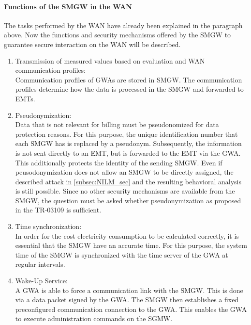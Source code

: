 \\
\textbf{Functions of the SMGW in the WAN}
\\
\\
The tasks performed by the \gls{WAN} have already been explained in the paragraph above. Now the functions and security mechanisms offered by the \gls{SMGW} to guarantee secure interaction on the \gls{WAN} will be described.
\begin{enumerate}
\item Transmission of measured values based on evaluation and \gls{WAN} communication profiles:\\
Communication profiles of \gls{GWA}s are stored in \gls{SMGW}. The communication profiles determine how the data is processed in the \gls{SMGW} and forwarded to \gls{EMT}s.

\item Pseudonymization:\\
Data that is not relevant for billing must be pseudonomized for data protection reasons. For this purpose, the unique identification number that each \gls{SMGW} has is replaced by a pseudonym. Subsequently, the information is not sent directly to an \gls{EMT}, but is forwarded to the \gls{EMT} via the \gls{GWA}. This additionally protects the identity of the sending \gls{SMGW}.%
Even if peusodonymization does not allow an \gls{SMGW} to be directly assigned, the described attack in \ref{subsec:NILM_sec} and the resulting behavioral analysis is still possible. Since no other security mechanisms are available from the \gls{SMGW}, the question must be asked whether pseudonymization as proposed in the \gls{TR-03109} is sufficient.

\item Time synchronization:\\
In order for the cost electricity consumption to be calculated correctly, it is essential that the \gls{SMGW} have an accurate time. For this purpose, the system time of the \gls{SMGW} is synchronized with the time server of the \gls{GWA} at regular intervals.

\item Wake-Up Service:\\
A \gls{GWA} is able to force a communication link with the \gls{SMGW}. This is done via a data packet signed by the \gls{GWA}. The \gls{SMGW} then establishes a fixed preconfigured communication connection to the \gls{GWA}. This enables the \gls{GWA} to execute administration commands on the SGMW. 
\end{enumerate}
